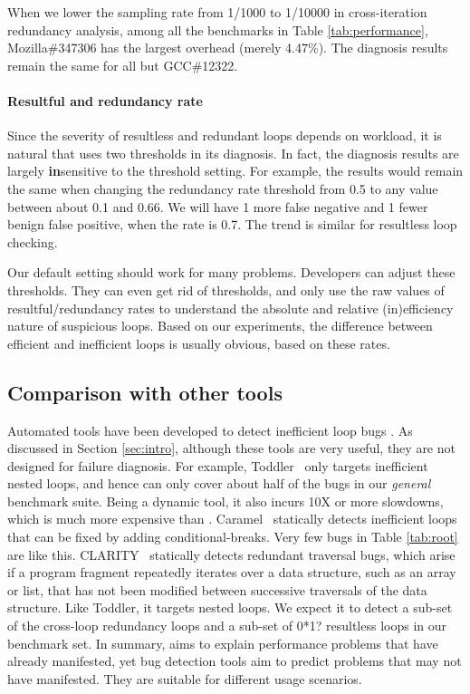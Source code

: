 When we lower the sampling rate from 1/1000 to 1/10000
in cross-iteration redundancy analysis,
among all the benchmarks in Table \ref{tab:performance},
Mozilla\#347306 has the largest overhead (merely 4.47\%). 
The diagnosis results remain 
the same for all but GCC\#12322.

\paragraph{Resultful and redundancy rate}
Since the severity of resultless and redundant loops depends on
workload, it is natural that \Tool uses two thresholds in its diagnosis.
In fact, the diagnosis results are largely {\bf in}sensitive to the threshold
setting. For example, the results would remain the same when
changing the redundancy rate threshold from 0.5 to any value between about
0.1 and 0.66. We will have 1 more false negative and 1 fewer benign false positive, 
when the rate is 0.7. The trend is similar for resultless
loop checking. 

Our default setting %
should work for many problems.
Developers can adjust these thresholds. 
They can even get rid of thresholds, and only
use the raw values of resultful/redundancy rates to understand
the absolute and relative (in)efficiency nature of suspicious 
loops. Based on our experiments, the difference between efficient and inefficient
loops is usually obvious, based on these rates.

\subsection{Comparison with other tools}

Automated tools have been developed to detect inefficient loop bugs
\cite{Alabama, CARAMEL, IsilDillig.PLDI15}. 
As discussed in Section \ref{sec:intro}, although these tools are very
useful, they are not designed for failure diagnosis. 
For example, Toddler~\cite{Alabama} only targets inefficient nested loops, and
hence can only cover about half of the bugs in our \emph{general} benchmark suite.
Being a dynamic tool, it also incurs 10X or more slowdowns, which is much more
expensive than \Tool. 
Caramel~\cite{CARAMEL} statically detects inefficient loops that can be fixed
by adding conditional-breaks. Very few bugs in Table \ref{tab:root} are like this.
CLARITY~\cite{IsilDillig.PLDI15} statically detects redundant traversal bugs, 
which arise if a program fragment repeatedly iterates over a data structure, such as an array or list, that has not been modified between successive traversals of the data structure.
Like Toddler, it targets nested loops.
We expect it to detect a sub-set of the cross-loop redundancy
loops and a sub-set of 0*1? resultless loops in our benchmark set.
In summary, \Tool aims to explain performance problems that have 
already manifested,
yet bug detection tools aim to predict problems that may not have manifested.
They are suitable for different usage scenarios.

